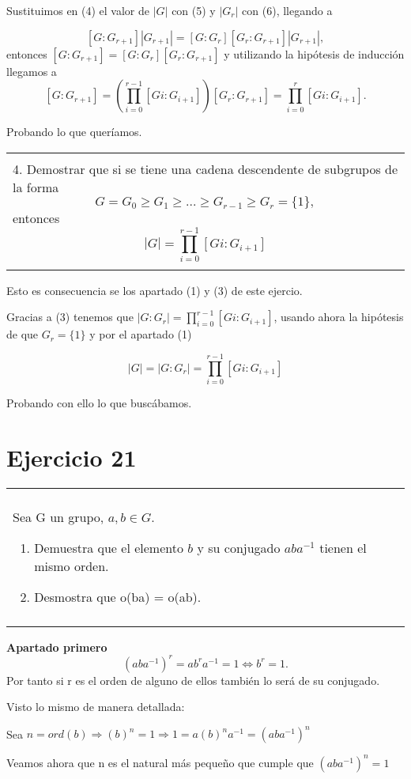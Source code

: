 \documentclass[12pt]{article}
\newenvironment{micaja}
{
    \begin{center}
    \begin{tabular}{|p{0.9\textwidth}|}
    \hline\\
    }   
    {   
    \\\\\hline
    \end{tabular} 
    \end{center}
    }
\begin{document}
Sustituimos en (4) el valor de $|G|$ con (5) y $|G_r|$ con (6), llegando a 

$$[G:G_{r+1}] |G_{r+1}|= [G:G_r] [G_r:G_{r+1}] |G_{r+1}|,
$$
entonces 
$[G:G_{r+1}] = [G:G_r] [G_r:G_{r+1}]$ y utilizando la hipótesis de inducción 
llegamos a 
$$[G:G_{r+1}]= (\prod_{i=0}^{r-1}[Gi:G_{i+1}]) [G_r:G_{r+1}] = \prod_{i=0}^{r}[Gi:G_{i+1}].$$

Probando lo que queríamos. 


\begin{micaja}
    4. Demostrar que si se tiene una cadena descendente de subgrupos de la forma
    $$G=G_0 \geq G_1 \geq ...   \geq G_{r-1} \geq G_r=\{1\},$$ 
    entonces 
    $$|G| = \prod_{i=0}^{r-1}[Gi:G_{i+1}]$$
\end{micaja}

Esto es consecuencia se los apartado (1) y (3) de este ejercio. 

Gracias a (3) tenemos que  $|G:G_r| = \prod_{i=0}^{r-1}[Gi:G_{i+1}]$, 
usando ahora la hipótesis de que $G_r=\{1\}$ y por el apartado (1)

$$|G| = |G:G_r| = \prod_{i=0}^{r-1}[Gi:G_{i+1}]$$

Probando con ello lo que buscábamos. 


\newpage

\section[Ejercicio 21]{Ejercicio 21}  
\begin{micaja}
    Sea G un grupo, $a,b \in G$. 
    \begin{enumerate}
\item  Demuestra que el elemento $b$ y su conjugado $aba^{-1}$ tienen el mismo orden.  
\item Desmostra que o(ba) = o(ab).
    \end{enumerate}
\end{micaja}

\textbf{Apartado primero}  
$$(aba^{-1})^r = a b^r a^{-1} = 1  \Longleftrightarrow b^r = 1.$$ 
Por tanto si r es el orden de alguno de ellos también lo será de su conjugado.



Visto lo mismo de manera detallada:

Sea $n=ord(b) \Longrightarrow (b)^n = 1 \Longrightarrow 1 = a(b)^na^{-1} = (aba^{-1})^n$ 

Veamos ahora que n es el natural más pequeño que cumple que $(aba^{-1})^n = 1$
\end{document}
